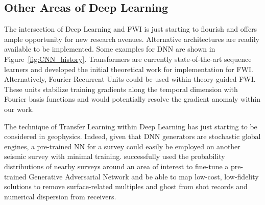 


\subsection{Other Areas of Deep Learning}
The intersection of Deep Learning and FWI is just starting to flourish and offers ample opportunity for new research avenues. Alternative architectures are readily available to be implemented. Some examples for DNN are shown in Figure~\ref{fig:CNN_history}. Transformers \citep{Vaswani2017} are currently state-of-the-art sequence learners and \cite{Shalova2020} developed the initial theoretical work for implementation for FWI. Alternatively, Fourier Recurrent Units \citep{Zhang2018} could be used within theory-guided FWI. These units stabilize training gradients along the temporal dimension with Fourier basis functions and would potentially resolve the gradient anomaly within our work.

The technique of Transfer Learning within Deep Learning has just starting to be considered in geophysics. Indeed, given that DNN generators are stochastic global engines, a pre-trained NN for a survey could easily be employed on another seismic survey with minimal training. \cite{Siahkoohi2019} successfully used the probability distributions of nearby surveys around an area of interest to fine-tune a pre-trained Generative Adversarial Network and be able to map low-cost, low-fidelity solutions to remove surface-related multiples and ghost from shot records and numerical dispersion from receivers.

